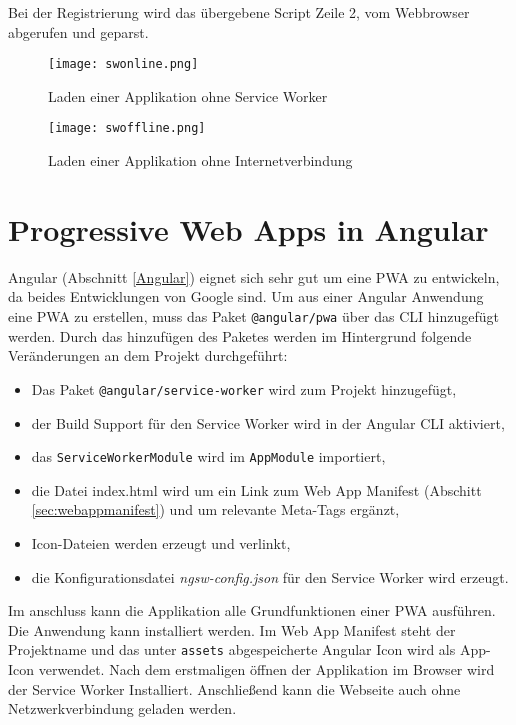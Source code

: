Bei der Registrierung wird das übergebene Script Zeile 2, vom Webbrowser abgerufen und geparst. 

\begin{figure}
    \centering
    \texttt{[image: swonline.png]}
    \caption{Laden einer Applikation ohne Service Worker}
    \label{img:swonline}
\end{figure}

\begin{figure}
    \centering
    \texttt{[image: swoffline.png]}
    \caption{Laden einer Applikation ohne Internetverbindung}
    \label{img:swoffline}
\end{figure}

\section{Progressive Web Apps in Angular}

Angular (Abschnitt \ref{Angular}) eignet sich sehr gut um eine PWA zu entwickeln, da beides Entwicklungen von Google sind. 
Um aus einer Angular Anwendung eine PWA zu erstellen, muss das Paket \texttt{@angular/pwa} über das \ac{CLI} hinzugefügt werden.
Durch das hinzufügen des Paketes werden im Hintergrund folgende Veränderungen an dem Projekt durchgeführt: 
\begin{itemize}
    \item Das Paket \texttt{@angular/service-worker} wird zum Projekt hinzugefügt,
    \item der Build Support für den Service Worker wird in der Angular CLI aktiviert,
    \item das \texttt{ServiceWorkerModule} wird im \texttt{AppModule} importiert,
    \item die Datei index.html wird um ein Link zum Web App Manifest (Abschitt \ref{sec:webappmanifest}) und um relevante Meta-Tags ergänzt,
    \item Icon-Dateien werden erzeugt und verlinkt,
    \item die Konfigurationsdatei \textit{ngsw-config.json} für den Service Worker wird erzeugt. 
\end{itemize}

Im anschluss kann die Applikation alle Grundfunktionen einer PWA ausführen. Die Anwendung kann installiert werden. Im Web App Manifest steht der Projektname und das unter \texttt{assets} abgespeicherte Angular Icon wird als App-Icon verwendet. Nach dem erstmaligen öffnen der Applikation im Browser wird der Service Worker Installiert. Anschließend kann die Webseite auch ohne Netzwerkverbindung geladen werden.  



